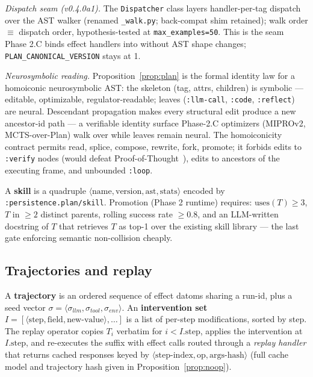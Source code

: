 \documentclass[anon]{nesy2026}   %
\newcommand{\C}[1]{\texttt{#1}}
\begin{document}
\emph{Dispatch seam (v0.4.0a1).} The \C{Dispatcher} class layers handler-per-tag dispatch over the AST walker (renamed \C{\_walk.py}; back-compat shim retained); walk order $\equiv$ dispatch order, hypothesis-tested at \C{max\_examples=50}. This is the seam Phase 2.C binds effect handlers into without AST shape changes; \C{PLAN\_CANONICAL\_VERSION} stays at 1.

\emph{Neurosymbolic reading.} Proposition~\ref{prop:plan} is the formal identity law for a homoiconic neurosymbolic AST: the skeleton (tag, attrs, children) is symbolic --- editable, optimizable, regulator-readable; leaves (\C{:llm-call}, \C{:code}, \C{:reflect}) are neural. Descendant propagation makes every structural edit produce a new ancestor-id path --- a verifiable identity surface Phase-2.C optimizers (MIPROv2, MCTS-over-Plan) walk over while leaves remain neural. The homoiconicity contract permits read, splice, compose, rewrite, fork, promote; it forbids edits to \C{:verify} nodes (would defeat Proof-of-Thought~\citep{fan2024proofofthought}), edits to ancestors of the executing frame, and unbounded \C{:loop}.

A \textbf{skill} is a quadruple $\langle \text{name}, \text{version}, \text{ast}, \text{stats} \rangle$ encoded by \C{:persistence.plan/skill}. Promotion (Phase 2 runtime) requires: $\text{uses}(T) \geq 3$, $T$ in $\geq 2$ distinct parents, rolling success rate $\geq 0.8$, and an LLM-written docstring of $T$ that retrieves $T$ as top-1 over the existing skill library --- the last gate enforcing semantic non-collision cheaply.

\subsection{Trajectories and replay}\label{sec:replay}

A \textbf{trajectory} is an ordered sequence of effect datoms sharing a run-id, plus a seed vector $\sigma = \langle \sigma_{llm}, \sigma_{tool}, \sigma_{env} \rangle$. An \textbf{intervention set} $I = [\langle \text{step}, \text{field}, \text{new-value} \rangle, \dots]$ is a list of per-step modifications, sorted by step. The replay operator copies $T_i$ verbatim for $i < I.\text{step}$, applies the intervention at $I.\text{step}$, and re-executes the suffix with effect calls routed through a \emph{replay handler} that returns cached responses keyed by $\langle \text{step-index}, \text{op}, \text{args-hash} \rangle$ (full cache model and trajectory hash given in Proposition~\ref{prop:noop}).
\end{document}
